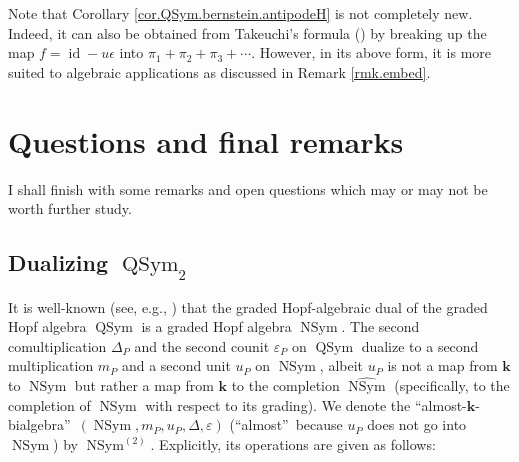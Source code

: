 \documentclass[numbers=enddot,12pt,final,onecolumn,notitlepage,abstracton]{scrartcl}%
\theoremstyle{definition}
\begin{document}
Note that Corollary \ref{cor.QSym.bernstein.antipodeH} is not completely new.
Indeed, it can also be obtained from Takeuchi's formula (\cite[Proposition
1.4.24]{Reiner}) by breaking up the map $f=\operatorname*{id}-u\epsilon$ into
$\pi_{1}+\pi_{2}+\pi_{3}+\cdots$. However, in its above form, it is more
suited to algebraic applications as discussed in Remark \ref{rmk.embed}.

\section{Questions and final remarks}

I shall finish with some remarks and open questions which may or may not be
worth further study.

\subsection{Dualizing $\operatorname*{QSym}\nolimits_{2}$}

It is well-known (see, e.g., \cite[\S 5.4]{Reiner}) that the graded
Hopf-algebraic dual of the graded Hopf algebra $\operatorname*{QSym}$ is a
graded Hopf algebra $\operatorname*{NSym}$. The second comultiplication
$\Delta_{P}$ and the second counit $\varepsilon_{P}$ on $\operatorname*{QSym}$
dualize to a second multiplication $m_{P}$ and a second unit $u_{P}$ on
$\operatorname*{NSym}$, albeit $u_{P}$ is not a map from $\mathbf{k}$ to
$\operatorname*{NSym}$ but rather a map from $\mathbf{k}$ to the completion
$\widehat{\operatorname*{NSym}}$ (specifically, to the completion of
$\operatorname*{NSym}$ with respect to its grading). We denote the
\textquotedblleft almost-$\mathbf{k}$-bialgebra\textquotedblright\ $\left(
\operatorname*{NSym},m_{P},u_{P},\Delta,\varepsilon\right)  $
(\textquotedblleft almost\textquotedblright\ because $u_{P}$ does not go into
$\operatorname*{NSym}$) by $\operatorname*{NSym}\nolimits^{\left(  2\right)
}$. Explicitly, its operations are given as follows:
\end{document}
